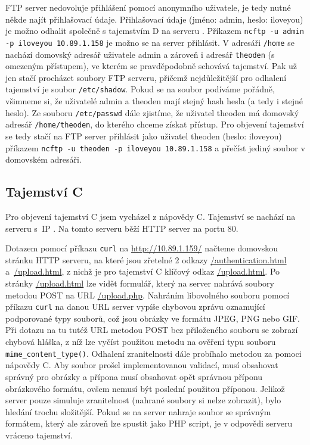 \documentclass[a4paper, 11pt]{article}
\begin{document}
FTP server nedovoluje přihlášení pomocí anonymního uživatele, je tedy nutné někde najít přihlašovací údaje. Přihlašovací údaje (jméno: admin, heslo: iloveyou) je možno odhalit společně s tajemstvím D na serveru . Příkazem \verb|ncftp -u admin -p iloveyou 10.89.1.158| je možno se na server přihlásit. V adresáři \texttt{/home} se nachází domovský adresář uživatele admin a zároveň i adresář \texttt{theoden} (s omezeným přístupem), ve kterém se pravděpodobně schovává tajemství. Pak už jen stačí procházet soubory FTP serveru, přičemž nejdůležitější pro odhalení tajemství je soubor \texttt{/etc/shadow}. Pokud se na soubor podíváme pořádně, všimneme si, že uživatelé admin a theoden mají stejný hash hesla (a tedy i stejné heslo). Ze souboru \texttt{/etc/passwd} dále zjistíme, že uživatel theoden má domovský adresář  \texttt{/home/theoden}, do kterého chceme získat přístup. Pro objevení tajemství se tedy stačí na FTP server přihlásit jako uživatel theoden (heslo: iloveyou) příkazem \verb|ncftp -u theoden -p iloveyou 10.89.1.158| a přečíst jediný soubor v domovském adresáři.



\subsection{Tajemství C}

Pro objevení tajemství C jsem vycházel z nápovědy C.  Tajemství se nachází na serveru  s~IP . Na tomto serveru běží HTTP server na portu 80.

Dotazem pomocí příkazu \texttt{curl} na \url{http://10.89.1.159/} načteme domovskou stránku HTTP serveru, na které jsou zřetelné 2 odkazy \url{/authentication.html} a~\url{/upload.html}, z nichž je pro tajemství C klíčový odkaz \url{/upload.html}. Po  stránky \url{/upload.html} lze vidět formulář, který na server nahrává soubory metodou POST na URL \url{/upload.php}. Nahráním libovolného souboru pomocí příkazu \texttt{curl} na danou URL server vypíše chybovou zprávu oznamující podporované typy souborů, což jsou obrázky ve formátu JPEG, PNG nebo GIF. Při dotazu na tu tutéž URL metodou POST bez přiloženého souboru se zobrazí chybová hláška, z níž lze vyčíst použitou metodu na ověření typu souboru \texttt{ mime\_content\_type()}. Odhalení zranitelnosti dále probíhalo metodou  za pomoci nápovědy C. Aby soubor prošel implementovanou validací, musí obsahovat správný  pro obrázky a přípona musí obsahovat opět správnou příponu obrázkového formátu, ovšem nemusí být poslední použitou příponou. Jelikož server pouze simuluje zranitelnost (nahrané soubory si nelze zobrazit), bylo hledání trochu složitější. Pokud se na server nahraje soubor se správným formátem, který ale zároveň lze spustit jako PHP script, je v odpovědi serveru vráceno tajemství.
\end{document}

